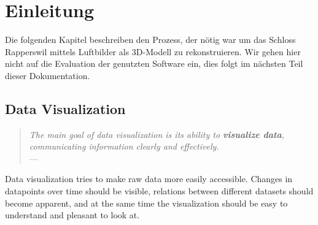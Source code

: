 \chapter{Einleitung}


Die folgenden Kapitel beschreiben den Prozess, der nötig war um das Schloss
Rapperswil mittels Luftbilder als 3D-Modell zu rekonstruieren. Wir gehen hier
nicht auf die Evaluation der genutzten Software ein, dies folgt im nächsten Teil
dieser Dokumentation.


\section{Data Visualization}\label{sec:datavis}

\begin{quote}{\slshape
The main goal of data visualization is its ability to \textbf{visualize data},
communicating information clearly and effectively.} \\ \medskip
---  \citep{friedman:2008}
\end{quote}

Data visualization tries to make raw data more easily accessible. Changes in
datapoints over time should be visible, relations between different datasets
should become apparent, and at the same time the visualization should be easy to
understand and pleasant to look at.
